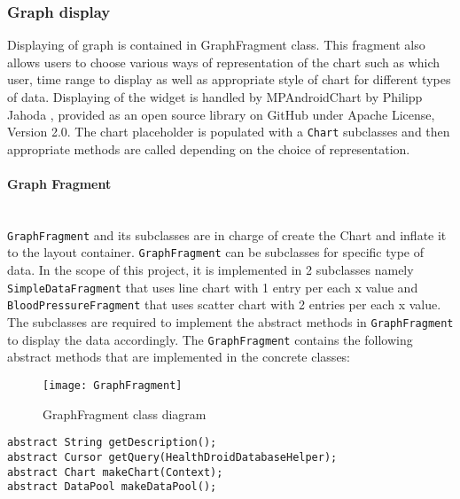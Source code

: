 \subsubsection{Graph display}
Displaying of graph is contained in GraphFragment class. This fragment also allows users to choose various ways of
representation of the chart such as which user, time range to display as well as appropriate style of chart for
different types of data. Displaying of the widget is handled by MPAndroidChart by Philipp Jahoda \cite{MPAndroidChart},
provided as an open source library on GitHub under Apache License, Version 2.0. The chart placeholder is populated with a
\texttt{Chart} subclasses and then appropriate methods are called depending on the choice of representation.

\paragraph{Graph Fragment}\mbox{} \\
\texttt{GraphFragment} and its subclasses are in charge of create the Chart and inflate it to the layout container.
\texttt{GraphFragment} can be subclasses for specific type of data. In the scope of this project, it is implemented in 2
subclasses namely \texttt{SimpleDataFragment} that uses line chart with 1 entry per each x value and
\texttt{BloodPressureFragment} that uses scatter chart with 2 entries per each x value. The subclasses are required to
implement the abstract methods in \texttt{GraphFragment} to display the data accordingly.  The \texttt{GraphFragment}
contains the following abstract methods that are implemented in the concrete classes:

\begin{figure}[!ht]
    \caption{GraphFragment class diagram}
    \centering
    \texttt{[image: GraphFragment]}
\end{figure}

\begin{lstlisting}
abstract String getDescription();
abstract Cursor getQuery(HealthDroidDatabaseHelper);
abstract Chart makeChart(Context);
abstract DataPool makeDataPool();
\end{lstlisting}

